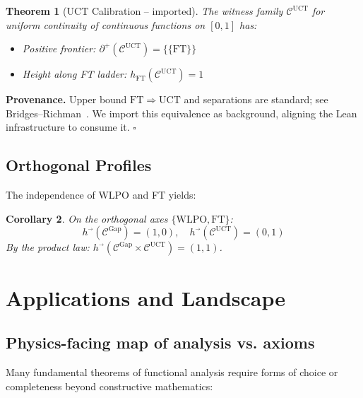 \documentclass[11pt]{article}
\newtheorem{theorem}{Theorem}[section]
\newtheorem{corollary}[theorem]{Corollary}
\newenvironment{proof}[1][Proof]{\noindent\textbf{#1.}\hspace{0.5em}}{\hfill$\square$\par}
\newcommand{\WLPO}{\mathrm{WLPO}}
\newcommand{\FT}{\mathrm{FT}}
\newcommand{\Frontierpos}{\partial^{+}}
\newcommand{\UCT}{\mathrm{UCT}}
\begin{document}
\begin{theorem}[UCT Calibration -- imported]\label{thm:uct-calib}
The witness family $\mathcal{C}^{\UCT}$ for uniform continuity of continuous functions on $[0,1]$ has:
\begin{itemize}
\item Positive frontier: $\Frontierpos(\mathcal{C}^{\UCT}) = \{\{\FT\}\}$
\item Height along FT ladder: $h_{\FT}(\mathcal{C}^{\UCT}) = 1$
\end{itemize}
\end{theorem}

\begin{proof}[Provenance]
Upper bound $\FT\Rightarrow\UCT$ and separations are standard; see Bridges--Richman~\cite{bridges2007}.
We import this equivalence as background, aligning the Lean infrastructure to consume it.
\end{proof}

\subsection{Orthogonal Profiles}

The independence of WLPO and FT yields:

\begin{corollary}
On the orthogonal axes $\{\WLPO, \FT\}$:
\[
h^{\vec{}}(\mathcal{C}^{\text{Gap}}) = (1, 0), \quad h^{\vec{}}(\mathcal{C}^{\UCT}) = (0, 1)
\]
By the product law: $h^{\vec{}}(\mathcal{C}^{\text{Gap}} \times \mathcal{C}^{\UCT}) = (1, 1)$.
\end{corollary}

\section{Applications and Landscape}\label{sec:applications}

\subsection{Physics-facing map of analysis vs. axioms}

Many fundamental theorems of functional analysis require forms of choice or completeness beyond constructive mathematics:
\end{document}
